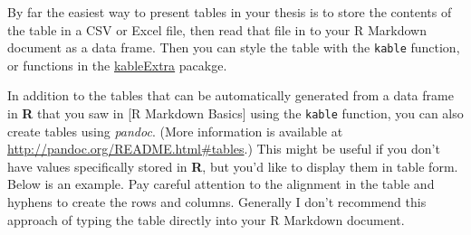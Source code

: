 \documentclass[ms]{uncgdissertationexp}
\theoremstyle{plain}
\theoremstyle{definition}
\theoremstyle{remark}
\begin{document}
  By far the easiest way to present tables in your thesis is to store the
  contents of the table in a CSV or Excel file, then read that file in to
  your R Markdown document as a data frame. Then you can style the table
  with the \texttt{kable} function, or functions in the
  \href{https://cran.r-project.org/web/packages/kableExtra/index.html}{kableExtra}
  pacakge.
  
  In addition to the tables that can be automatically generated from a
  data frame in \textbf{R} that you saw in {[}R Markdown Basics{]} using
  the \texttt{kable} function, you can also create tables using
  \emph{pandoc}. (More information is available at
  \url{http://pandoc.org/README.html\#tables}.) This might be useful if
  you don't have values specifically stored in \textbf{R}, but you'd like
  to display them in table form. Below is an example. Pay careful
  attention to the alignment in the table and hyphens to create the rows
  and columns. Generally I don't recommend this approach of typing the
  table directly into your R Markdown document.
\end{document}
